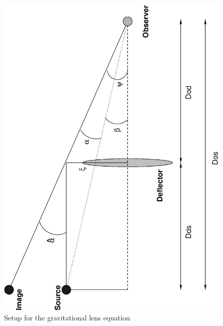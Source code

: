 \documentclass[a4paper]{IEEEtran}
\begin{document}
\begin{figure}
    \label{fig:lens-equation}
    \caption{Setup for the gravitational lens equation} 
    \begin{center}
        \includegraphics[angle=-90,width=\columnwidth]{images/setup.eps}
    \end{center}
\end{figure} 
\end{document}
